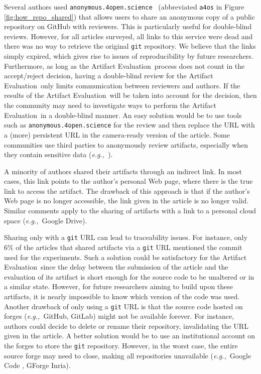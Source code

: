 \documentclass[sigconf,natbib=false]{acmart}
\newcommand{\eg}{\emph{e.g.,}}
\newcommand{\aeval}{Artifact Evaluation}
\begin{document}
Several authors used \texttt{anonymous.4open.science}\ \cite{anonymous_github} (abbreviated \texttt{a4os} in Figure \ref{fig:how_repo_shared}) that allows users to share an anonymous copy of a public repository on GitHub with reviewers.
This is particularly useful for double-blind reviews.
However, for all articles surveyed, all links to this service were dead and there was no way to retrieve the original \texttt{git} repository.
We believe that the links simply expired, which gives rise to issues of reproducibility by future researchers.
Furthermore, as long as the \aeval\ process does not count in the accept/reject decision, having a double-blind review for the \aeval\ only limits communication between reviewers and authors.
If the results of the \aeval\ will be taken into account for the decision, then the community may need to investigate ways to perform the \aeval\ in a double-blind manner.
An easy solution would be to use tools such as \texttt{anonymous.4open.science} \cite{anonymous_github} for the review and then replace the URL with a (more) persistent URL in the camera-ready version of the article.
Some communities use third parties to anonymously review artifacts, especially when they contain sensitive data (\eg\ \cite{perignon2019certify}).

A minority of authors shared their artifacts through an indirect link.
In most cases, this link points to the author's personal Web page, where there is the true link to access the artifact.
The drawback of this approach is that if the author's Web page is no longer accessible, the link given in the article is no longer valid.
Similar comments apply to the sharing of artifacts with a link to a personal cloud space (\eg\ Google Drive).

Sharing only with a \texttt{git} URL can lead to traceability issues.
For instance, only 6\% of the articles that shared artifacts via a \texttt{git} URL mentioned the commit used for the experiments.
Such a solution could be satisfactory for the \aeval\ since the delay between the submission of the article and the evaluation of its artifact is short enough for the source code to be unaltered or in a similar state.
However, for future researchers aiming to build upon these artifacts, it is nearly impossible to know which version of the code was used.
Another drawback of only using a \texttt{git} URL is that the source code hosted on forges (\eg\ GitHub, GitLab) might not be available forever.
For instance, authors could decide to delete or rename their repository, invalidating the URL given in the article.
A better solution would be to use an institutional account on the forges to store the \texttt{git} repository.
However, in the worst case, the entire source forge may need to close, making all repositories unavailable (\eg\ Google Code \cite{google_code}, GForge Inria).
\end{document}
